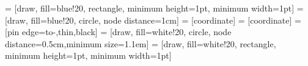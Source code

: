 \usetikzlibrary{shapes,arrows}
\usetikzlibrary{positioning}

 = [draw, fill=blue!20, rectangle, 
    minimum height=1pt, minimum width=1pt]
 = [draw, fill=blue!20, circle, node distance=1cm]
 = [coordinate]
 = [coordinate]
 = [pin edge={to-,thin,black}]
 = [draw, fill=white!20, circle, node distance=0.5cm,minimum size=1.1em]
 = [draw, fill=white!20, rectangle, 
    minimum height=1pt, minimum width=1pt]